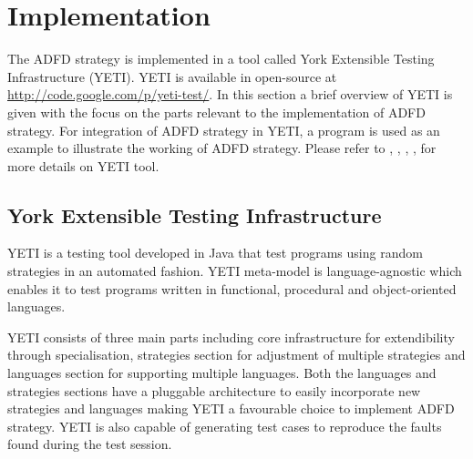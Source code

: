 \documentclass[runningheads,a4paper]{llncs}
\begin{document}



\section{Implementation}\label{sec:implementation}
The ADFD strategy is implemented in a tool called York Extensible Testing Infrastructure (YETI). YETI is available in open-source at \url{http://code.google.com/p/yeti-test/}. In this section a brief overview of YETI is given with the focus on the parts relevant to the implementation of ADFD strategy. For integration of ADFD strategy in YETI, a program is used as an example to illustrate the working of ADFD strategy. Please refer to  \cite{Oriol2011},  \cite{Oriol2012}, \cite{Oriol2010},  \cite{Oriol2010a},  \cite{Oriol2010b} for more details on YETI tool.

 \subsection{York Extensible Testing Infrastructure}
YETI is a testing tool developed in Java that test programs using random strategies in an automated fashion. YETI meta-model is language-agnostic which enables it to test programs written in functional, procedural and object-oriented languages.

YETI consists of three main parts including core infrastructure for extendibility through specialisation, strategies section for adjustment of multiple strategies and languages section for supporting multiple languages. Both the languages and strategies sections have a pluggable architecture to easily incorporate new strategies and languages making YETI a favourable choice to implement ADFD strategy. YETI is also capable of generating test cases to reproduce the faults found during the test session.
 
\end{document}
